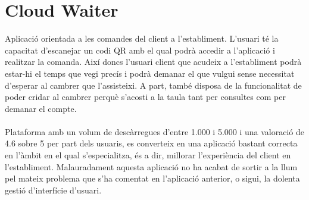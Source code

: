 
\newpage
\section{Cloud Waiter}

Aplicació\cite{cloudwaiter} orientada a les comandes del client a l'establiment. L'usuari té la capacitat d'escanejar un codi QR amb el qual podrà accedir a l'aplicació i realitzar la comanda. Així doncs l'usuari client que acudeix a l'establiment podrà estar-hi el temps que vegi precís i podrà demanar el que vulgui sense necessitat d'esperar al cambrer que l'assisteixi. A part, també disposa de la funcionalitat de poder cridar al cambrer perquè s'acosti a la taula tant per consultes com per demanar el compte.
\\\\
Plataforma amb un volum de descàrregues d'entre 1.000 i 5.000 i una valoració de 4.6 sobre 5 per part dels usuaris, es converteix en una aplicació bastant correcta en l'àmbit en el qual s'especialitza, és a dir, millorar l'experiència del client en l'establiment. Malauradament aquesta aplicació no ha acabat de sortir a la llum pel mateix problema que s'ha comentat en l'aplicació anterior, o sigui, la dolenta gestió d'interfície d'usuari.
\\
